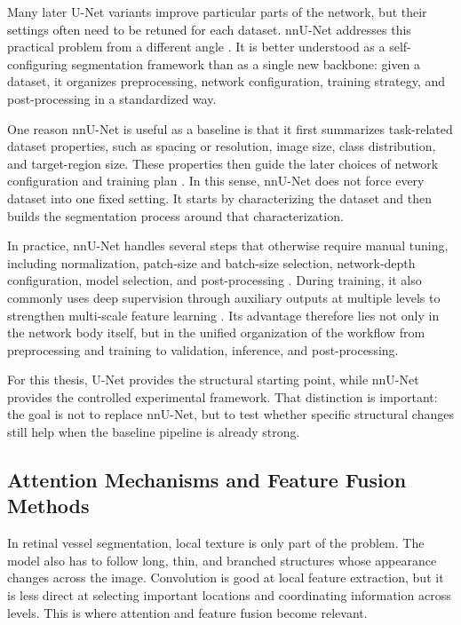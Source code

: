 \documentclass[a4paper,11pt]{article}
\begin{document}
Many later U-Net variants improve particular parts of the network, but their settings often need to be retuned for each dataset. nnU-Net addresses this practical problem from a different angle \cite{isensee2021nnunet}. It is better understood as a self-configuring segmentation framework than as a single new backbone: given a dataset, it organizes preprocessing, network configuration, training strategy, and post-processing in a standardized way.

One reason nnU-Net is useful as a baseline is that it first summarizes task-related dataset properties, such as spacing or resolution, image size, class distribution, and target-region size. These properties then guide the later choices of network configuration and training plan \cite{isensee2021nnunet}. In this sense, nnU-Net does not force every dataset into one fixed setting. It starts by characterizing the dataset and then builds the segmentation process around that characterization.

In practice, nnU-Net handles several steps that otherwise require manual tuning, including normalization, patch-size and batch-size selection, network-depth configuration, model selection, and post-processing \cite{isensee2021nnunet}. During training, it also commonly uses deep supervision through auxiliary outputs at multiple levels to strengthen multi-scale feature learning \cite{isensee2021nnunet,lee2015dsn}. Its advantage therefore lies not only in the network body itself, but in the unified organization of the workflow from preprocessing and training to validation, inference, and post-processing.

For this thesis, U-Net provides the structural starting point, while nnU-Net provides the controlled experimental framework. That distinction is important: the goal is not to replace nnU-Net, but to test whether specific structural changes still help when the baseline pipeline is already strong.

\subsection{Attention Mechanisms and Feature Fusion Methods}
In retinal vessel segmentation, local texture is only part of the problem. The model also has to follow long, thin, and branched structures whose appearance changes across the image. Convolution is good at local feature extraction, but it is less direct at selecting important locations and coordinating information across levels. This is where attention and feature fusion become relevant.
\end{document}
